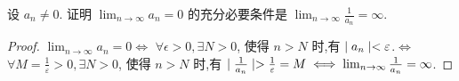 \begin{practice}
    设 $a_n\ne 0$. 证明 $\lim_{n\to\infty} a_n=0$ 的充分必要条件是 $\lim_{n\to\infty}\frac{1}{a_n}=\infty$.
\end{practice}

\begin{proof}
    $\lim_{n\to\infty} a_n=0\iff$ $\forall \epsilon>0,\exists N>0$, 使得 $n>N$ 时,有 $\mid a_n \mid<\varepsilon$.$\iff $ $\forall M=\frac{1}{\varepsilon}>0,\exists N>0$, 使得 $n>N$ 时,有 $\mid \frac{1}{a_n} \mid>\frac{1}{\varepsilon}=M\iff \lim_{n\to\infty}\frac{1}{a_n}=\infty$.
\end{proof}

